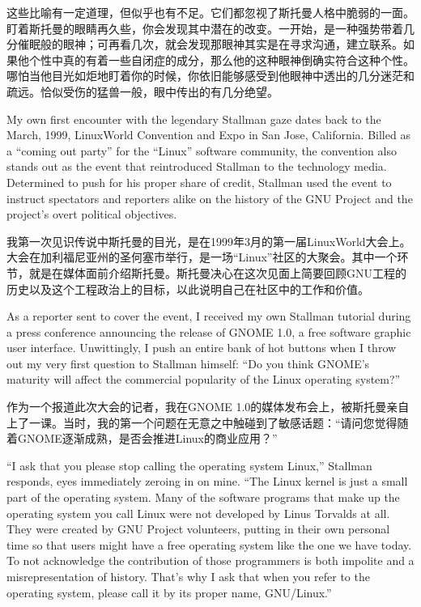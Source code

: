 \ifdefined\chs
这些比喻有一定道理，但似乎也有不足。它们都忽视了斯托曼人格中脆弱的一面。盯着斯托曼的眼睛再久些，你会发现其中潜在的改变。一开始，是一种强势带着几分催眠般的眼神；可再看几次，就会发现那眼神其实是在寻求沟通，建立联系。如果他个性中真的有着一些自闭症的成分，那么他的这种眼神倒确实符合这种个性。哪怕当他目光如炬地盯着你的时候，你依旧能够感受到他眼神中透出的几分迷茫和疏远。恰似受伤的猛兽一般，眼中传出的有几分绝望。
\fi

\ifdefined\eng
My own first encounter with the legendary Stallman gaze dates back to the March, 1999, LinuxWorld Convention and Expo in San Jose, California. Billed as a ``coming out party'' for the ``Linux'' software community, the convention also stands out as the event that reintroduced Stallman to the technology media. Determined to push for his proper share of credit, Stallman used the event to instruct spectators and reporters alike on the history of the GNU Project and the project's overt political objectives.
\fi

\ifdefined\chs
我第一次见识传说中斯托曼的目光，是在1999年3月的第一届LinuxWorld大会上。大会在加利福尼亚州的圣何塞市举行，是一场``Linux''社区的大聚会。其中一个环节，就是在媒体面前介绍斯托曼。斯托曼决心在这次见面上简要回顾GNU工程的历史以及这个工程政治上的目标，以此说明自己在社区中的工作和价值。
\fi

\ifdefined\eng
As a reporter sent to cover the event, I received my own Stallman tutorial during a press conference announcing the release of GNOME 1.0, a free software graphic user interface. Unwittingly, I push an entire bank of hot buttons when I throw out my very first question to Stallman himself: ``Do you think GNOME's maturity will affect the commercial popularity of the Linux operating system?''
\fi

\ifdefined\chs
作为一个报道此次大会的记者，我在GNOME 1.0的媒体发布会上，被斯托曼亲自上了一课。当时，我的第一个问题在无意之中触碰到了敏感话题：``请问您觉得随着GNOME逐渐成熟，是否会推进Linux的商业应用？''
\fi

\ifdefined\eng
``I ask that you please stop calling the operating system Linux,'' Stallman responds, eyes immediately zeroing in on mine. ``The Linux kernel is just a small part of the operating system. Many of the software programs that make up the operating system you call Linux were not developed by Linus Torvalds at all. They were created by GNU Project volunteers, putting in their own personal time so that users might have a free operating system like the one we have today. To not acknowledge the contribution of those programmers is both impolite and a misrepresentation of history. That's why I ask that when you refer to the operating system, please call it by its proper name, GNU/Linux.''
\fi

